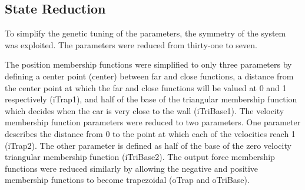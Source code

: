 \subsection{State Reduction} To simplify the genetic tuning of the parameters, the symmetry of the system
was exploited. The parameters were reduced from thirty-one to seven. 

The position membership functions were
simplified to only three parameters by defining a center point (center) between far and close functions, a
distance from the center point at which the far and close functions will be valued at 0 and 1 respectively
(iTrap1), and half of the base of the triangular membership function which decides when the car is very close
to the wall (iTriBase1). The velocity membership function parameters were reduced to two parameters. One
parameter describes the distance from 0 to the point at which each of the velocities reach 1 (iTrap2). The
other parameter is defined as half of the base of the zero velocity triangular membership function
(iTriBase2). The output force membership functions were reduced similarly by allowing the negative and
positive membership functions to become trapezoidal (oTrap and oTriBase). 

